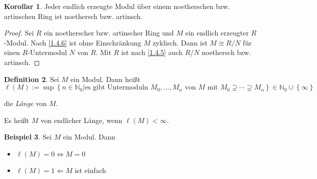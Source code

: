 \documentclass[
twoside=semi,
fontsize=12,
DIV=12, 
cleardoublepage=current,
leqno,
headings=optiontoheadandtoc, 
toc=idx
]{scrbook}
\newcommand{\N}{\mathbb{N}}
\newcommand{\set}[1]{\left\{ #1 \right\}}
\theoremstyle{definition}
\newtheorem{definition}{Definition}[section]
\newtheorem{beispiel}[definition]{Beispiel}
\newtheorem{korollar}[definition]{Korollar}
\begin{document}
	\begin{korollar}\label{1.4.7}
		Jeder endlich erzeugte Modul \"uber einem noetherschen bzw. artinschen Ring ist noethersch bzw. artinsch.
		
		\begin{proof}
			Sei $R$ ein noetherscher bzw. artinscher Ring und $M$ ein endlich erzeugter $R$-Modul. Nach \ref{1.4.6} ist ohne Einschr\"ankung $M$ zyklisch. Dann ist $M \cong R/N$ f\"ur einen $R$-Untermodul $N$ von $R$. Mit $R$ ist nach \ref{1.4.5} auch $R/N$ noethersch bzw. artinsch.
		\end{proof}
	\end{korollar}

	\begin{definition}\label{1.4.8}
		Sei $M$ ein Modul. Dann heißt 
			\[\ell(M) := \sup \set{n \in \N_0| \textrm{es gibt Untermoduln } M_0, \dots, M_n \textrm{ von } M \textrm{ mit } M_0 \supsetneq \cdots \supsetneq M_n} \in \N_0 \cup \set{\infty}\]
		
		die \emph{L\"ange} von $M$.
	
		\noindent Es heißt $M$ von endlicher L\"ange, wenn $\ell(M) < \infty$.
	\end{definition}

	\begin{beispiel}\label{1.4.9}
		Sei $M$ ein Modul. Dann 
		\begin{itemize}
			\item $\ell(M) = 0 \Leftrightarrow M = 0$
			\item $\ell(M) = 1 \Leftarrow M$ ist einfach
		\end{itemize}
	\end{beispiel}
\end{document}
